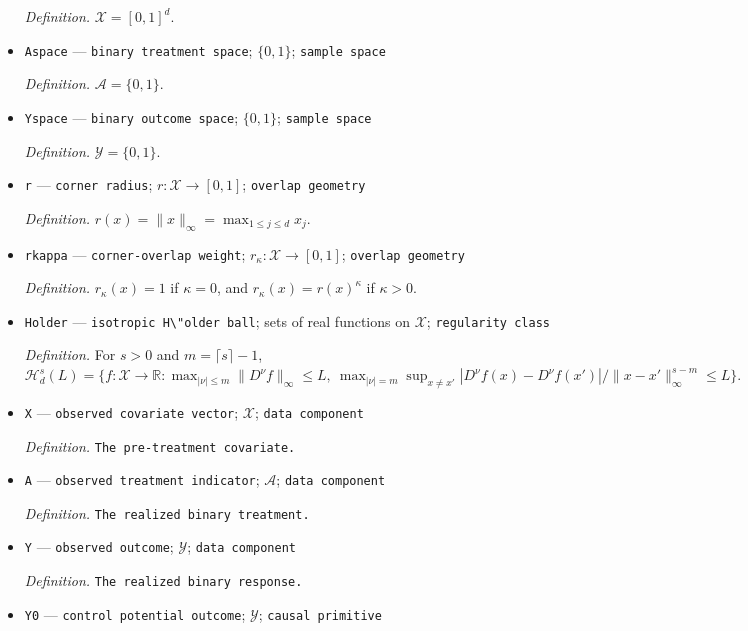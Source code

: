 \documentclass{article}
\begin{document}
\begin{itemize}
  \par\smallskip\noindent\emph{Definition.} \(\mathcal X=[0,1]^d\).
  \item \texttt{Aspace} --- \texttt{binary treatment space}; \(\{0,1\}\); \texttt{sample space}
  \par\smallskip\noindent\emph{Definition.} \(\mathcal A=\{0,1\}\).
  \item \texttt{Yspace} --- \texttt{binary outcome space}; \(\{0,1\}\); \texttt{sample space}
  \par\smallskip\noindent\emph{Definition.} \(\mathcal Y=\{0,1\}\).
  \item \texttt{r} --- \texttt{corner radius}; \(r:\mathcal X\to[0,1]\); \texttt{overlap geometry}
  \par\smallskip\noindent\emph{Definition.} \(r(x)=\lVert x\rVert_{\infty}=\max_{1\le j\le d}x_j\).
  \item \texttt{rkappa} --- \texttt{corner-\allowbreak{}overlap weight}; \(r_{\kappa}:\mathcal X\to[0,1]\); \texttt{overlap geometry}
  \par\smallskip\noindent\emph{Definition.} \(r_{\kappa}(x)=1\) if \(\kappa=0\), and \(r_{\kappa}(x)=r(x)^{\kappa}\) if \(\kappa>0\).
  \item \texttt{Holder} --- \texttt{isotropic H\textbackslash{}\allowbreak{}"older ball}; sets of real functions on \(\mathcal X\); \texttt{regularity class}
  \par\smallskip\noindent\emph{Definition.} For \(s>0\) and \(m=\lceil s\rceil-1\), \(\mathcal H^s_d(L)=\{f:\mathcal X\to\mathbb R:\max_{|\nu|\le m}\lVert D^{\nu}f\rVert_{\infty}\le L,\ \max_{|\nu|=m}\sup_{x\ne x'}|D^{\nu}f(x)-D^{\nu}f(x')|/\lVert x-x'\rVert_{\infty}^{s-m}\le L\}\).
  \item \texttt{X} --- \texttt{observed covariate vector}; \(\mathcal X\); \texttt{data component}
  \par\smallskip\noindent\emph{Definition.} \texttt{The pre-\allowbreak{}treatment covariate.}
  \item \texttt{A} --- \texttt{observed treatment indicator}; \(\mathcal A\); \texttt{data component}
  \par\smallskip\noindent\emph{Definition.} \texttt{The realized binary treatment.}
  \item \texttt{Y} --- \texttt{observed outcome}; \(\mathcal Y\); \texttt{data component}
  \par\smallskip\noindent\emph{Definition.} \texttt{The realized binary response.}
  \item \texttt{Y0} --- \texttt{control potential outcome}; \(\mathcal Y\); \texttt{causal primitive}

\end{itemize}
\end{document}
